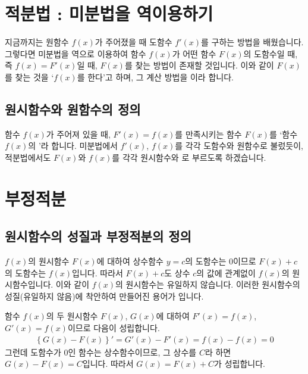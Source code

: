 

\section{적분법 : 미분법을 역이용하기}
지금까지는 원함수 $f\left( x \right) $가 주어졌을 때 도함수 $f'\left( x \right) $를 구하는 방법을 배웠습니다. 그렇다면 미분법을 역으로 이용하여 함수 $f(x)$가 어떤 함수 $F(x)$의 도함수일 때, 즉 $f(x)=F'(x)$일 때, $F(x)$를 찾는 방법이 존재할 것입니다. 이와 같이 $F(x)$를 찾는 것을 `$f(x)$를 한다'고 하며, 그 계산 방법을 이라 합니다. 

\subsection{원시함수와 원함수의 정의}
함수 $f(x)$가 주어져 있을 때, $F'(x)=f(x)$를 만족시키는 함수 $F(x)$를 `함수 $f(x)$의 '라 합니다. 미분법에서 $f'(x)$,  $f(x)$를 각각 도함수와 원함수로 불렀듯이, 적분법에서도 $F(x)$와 $f(x)$를 각각 원시함수와 로 부르도록 하겠습니다. 

\section{부정적분}
\subsection{원시함수의 성질과 부정적분의 정의}
$f(x)$의 원시함수 $F(x)$에 대하여 상수함수 $y=c$의 도함수는 $0$이므로 $F(x)+c$의 도함수는 $f(x)$입니다. 따라서 $F(x)+c$도 상수 $c$의 값에 관계없이 $f(x)$의 원시함수입니다. 이와 같이 $f(x)$의 원시함수는 유일하지 않습니다. 이러한 원시함수의 성질(유일하지 않음)에 착안하여 만들어진 용어가 입니다.

함수 $f(x)$의 두 원시함수 $F(x)$, $G(x)$에 대하여 $F'\left( x \right) = f\left( x \right) $, $G'\left( x \right) = f\left( x \right) $이므로 다음이 성립합니다.
\begin{align*} \left\{ G\left( x \right) - F\left( x \right) \right\}' = G'\left( x \right) - F'\left( x \right) = f\left( x \right) - f\left( x \right)  = 0 \end{align*}
그런데 도함수가 $0$인 함수는 상수함수이므로, 그 상수를 $C$라 하면 $G\left( x \right)  - F\left( x \right)  = C$입니다. 따라서 $G\left( x \right) = F\left( x \right) +C$가 성립합니다.

